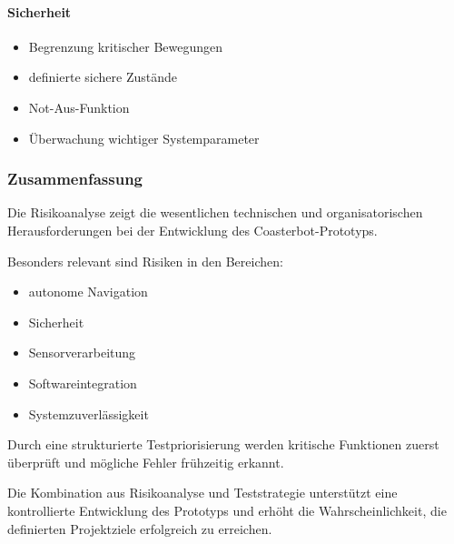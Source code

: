 \paragraph{Sicherheit}\label{sicherheit}

\begin{itemize}
\tightlist
\item
  Begrenzung kritischer Bewegungen
\item
  definierte sichere Zustände
\item
  Not-Aus-Funktion
\item
  Überwachung wichtiger Systemparameter
\end{itemize}

\subsubsection{Zusammenfassung}\label{zusammenfassung-7}

Die Risikoanalyse zeigt die wesentlichen technischen und
organisatorischen Herausforderungen bei der Entwicklung des
Coasterbot-Prototyps.

Besonders relevant sind Risiken in den Bereichen:

\begin{itemize}
\tightlist
\item
  autonome Navigation
\item
  Sicherheit
\item
  Sensorverarbeitung
\item
  Softwareintegration
\item
  Systemzuverlässigkeit
\end{itemize}

Durch eine strukturierte Testpriorisierung werden kritische Funktionen
zuerst überprüft und mögliche Fehler frühzeitig erkannt.

Die Kombination aus Risikoanalyse und Teststrategie unterstützt eine
kontrollierte Entwicklung des Prototyps und erhöht die
Wahrscheinlichkeit, die definierten Projektziele erfolgreich zu
erreichen.
